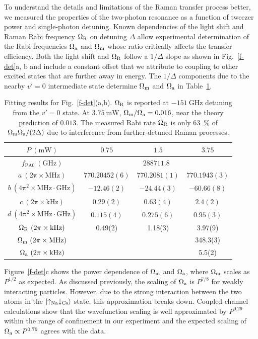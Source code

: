 \documentclass[aps,prx,twocolumn,10pt,superscriptaddress]{revtex4-2}
\begin{document}
To understand the details and limitations of the Raman transfer process better,
we measured the properties of the two-photon resonance as a function of tweezer power and single-photon detuning.
Known dependencies of the light shift and Raman Rabi frequency $\Omega_{\rm R}$ on detuning $\Delta$ allow experimental determination of the Rabi frequencies
$ \Omega_{\rm a} $ and $\Omega_{\rm m}$ whose ratio critically affects the transfer efficiency.
Both the light shift and $\Omega_{\rm R}$ follow a $1/\Delta$ slope as shown in Fig.~\ref{f-det}a, b and include a constant offset that we attribute to coupling to other excited states that are further away in energy.
The $1/\Delta$ components due to the nearby $v'=0$ intermediate state determine $\Omega_{\rm m} $ and $ \Omega_{\rm a} $ in Table~\ref{tab:f-det:fit}.

\begin{table}[ht]
  \centering
  \begin{tabular}{|c|c|c|c|}
    $P~(\mathrm{mW})$&$0.75$&$1.5$&$3.75$\\\hline
    $f_{\mathrm{PA}0}~(\mathrm{GHz})$&\multicolumn{3}{|c|}{$288711.8$}\\\hline
    $a~(\mathrm{2\pi\times MHz})$&$770.20452(6)$&$770.2081(1)$&$770.1943(3)$\\
    $b~(\mathrm{4\pi^2\times MHz\cdot GHz})$&$-12.46(2)$&$-24.44(3)$&$-60.66(8)$\\\hline
    $c~(\mathrm{2\pi\times kHz})$&$0.29(2)$&$0.63(4)$&$2.4(2)$\\
    $d~(\mathrm{4\pi^2\times MHz\cdot GHz})$&$0.115(4)$&$0.275(6)$&$0.95(3)$\\ \hline
    $\Omega_{\rm R}~(\mathrm{2\pi\times kHz})$ & 0.49(2) & 1.18(3) & 3.97(9) \\
    $\Omega_{\rm m}~(\mathrm{2\pi\times MHz})$ & & & 348.3(3) \\
    $\Omega_{\rm a}~(\mathrm{2\pi\times kHz})$ & & & 5.5(2)
  \end{tabular}
  \caption{Fitting results for Fig.~\ref{f-det}(a,b). $\Omega_{\rm R}$ is reported at $-151~\mathrm{GHz}$ detuning from the $v' = 0$ state.  At $3.75~\mathrm{mW}$, $\Omega_{\rm m}/\Omega_{\rm a}=0.016$, near the theory prediction of $0.013$.  The measured Rabi rate $\Omega_{\rm R}$ is only 63~\% of $\Omega_{\rm m} \Omega_{\rm a}/(2\Delta)$ due to interference from further-detuned Raman processes.
    \label{tab:f-det:fit}}
\end{table}

Figure~\ref{f-det}c shows the power dependence of $ \Omega_{\rm m} $ and $ \Omega_{\rm a} $, where $ \Omega_{\rm m} $ scales as $ P^{1/2} $ as expected. As discussed previously, the scaling of $ \Omega_{\rm a} $ is $P^{7/8}$ for weakly interacting particles.
However, due to the strong interaction between the two atoms in the $\ket{\uparrow_{\text{Na}}\downarrow_{\text{Cs}}}$ state, this approximation breaks down.
Coupled-channel calculations show that the wavefunction scaling
is well approximated by $P^{0.29}$ within the range of confinement in our experiment and the expected scaling of $ \Omega_{\rm a} \propto P^{0.79} $ agrees with the data.
\end{document}
